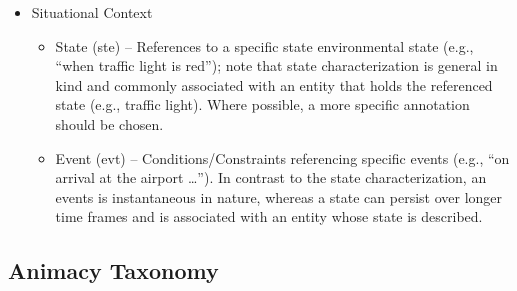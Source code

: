 \begin{itemize}
\item[] Situational Context

\begin{itemize}
\item State (ste) -- References to a specific state environmental state (e.g., ``when traffic light is red''); note that state characterization is general in kind and commonly associated with an entity that holds the referenced state (e.g., traffic light).  Where possible, a more specific annotation should be chosen.


\item Event (evt) -- Conditions/Constraints referencing specific events (e.g., ``on arrival at the airport \dots''). In contrast to the state characterization, an events is instantaneous in nature, whereas a state can persist over longer time frames and is associated with an entity whose state is described.

\end{itemize}
\end{itemize}



\newpage

\subsection{Animacy Taxonomy}

